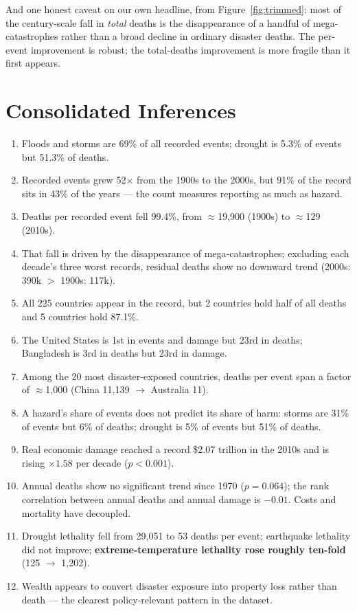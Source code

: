\documentclass[11pt,a4paper]{article}
\begin{document}
And one honest caveat on our own headline, from Figure~\ref{fig:trimmed}: most of
the century-scale fall in \emph{total} deaths is the disappearance of a handful
of mega-catastrophes rather than a broad decline in ordinary disaster deaths. The
per-event improvement is robust; the total-deaths improvement is more fragile
than it first appears.

\section{Consolidated Inferences}

\begin{enumerate}
\item Floods and storms are 69\% of all recorded events; drought is 5.3\% of
  events but 51.3\% of deaths.
\item Recorded events grew 52$\times$ from the 1900s to the 2000s, but 91\% of
  the record sits in 43\% of the years --- the count measures reporting as much
  as hazard.
\item Deaths per recorded event fell 99.4\%, from $\approx$19{,}900 (1900s) to
  $\approx$129 (2010s).
\item That fall is driven by the disappearance of mega-catastrophes; excluding
  each decade's three worst records, residual deaths show no downward trend
  (2000s: 390k $>$ 1900s: 117k).
\item All 225 countries appear in the record, but 2 countries hold half of all
  deaths and 5 countries hold 87.1\%.
\item The United States is 1st in events and damage but 23rd in deaths;
  Bangladesh is 3rd in deaths but 23rd in damage.
\item Among the 20 most disaster-exposed countries, deaths per event span a
  factor of $\approx$1{,}000 (China 11{,}139 $\rightarrow$ Australia 11).
\item A hazard's share of events does not predict its share of harm: storms are
  31\% of events but 6\% of deaths; drought is 5\% of events but 51\% of deaths.
\item Real economic damage reached a record \$2.07 trillion in the 2010s and is
  rising $\times 1.58$ per decade ($p < 0.001$).
\item Annual deaths show no significant trend since 1970 ($p = 0.064$); the rank
  correlation between annual deaths and annual damage is $-0.01$. Costs and
  mortality have decoupled.
\item Drought lethality fell from 29{,}051 to 53 deaths per event; earthquake
  lethality did not improve; \textbf{extreme-temperature lethality rose roughly
  ten-fold} (125 $\rightarrow$ 1{,}202).
\item Wealth appears to convert disaster exposure into property loss rather than
  death --- the clearest policy-relevant pattern in the dataset.
\end{enumerate}
\end{document}
